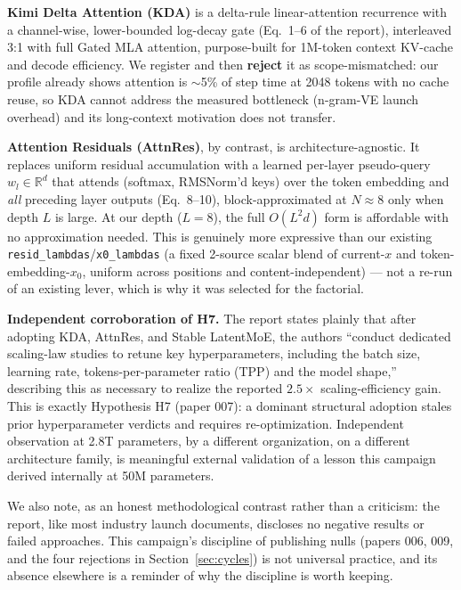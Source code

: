\documentclass{article}
\begin{document}
\textbf{Kimi Delta Attention (KDA)} is a delta-rule linear-attention recurrence with a channel-wise, lower-bounded log-decay gate (Eq.\ 1--6 of the report), interleaved 3:1 with full Gated MLA attention, purpose-built for 1M-token context KV-cache and decode efficiency. We register and then \textbf{reject} it as scope-mismatched: our profile already shows attention is $\sim$5\% of step time at 2048 tokens with no cache reuse, so KDA cannot address the measured bottleneck (n-gram-VE launch overhead) and its long-context motivation does not transfer.

\textbf{Attention Residuals (AttnRes)}, by contrast, is architecture-agnostic. It replaces uniform residual accumulation with a learned per-layer pseudo-query $w_l\in\mathbb{R}^d$ that attends (softmax, RMSNorm'd keys) over the token embedding and \emph{all} preceding layer outputs (Eq.\ 8--10), block-approximated at $N\!\approx\!8$ only when depth $L$ is large. At our depth ($L=8$), the full $O(L^2d)$ form is affordable with no approximation needed. This is genuinely more expressive than our existing \texttt{resid\_lambdas}/\texttt{x0\_lambdas} (a fixed 2-source scalar blend of current-$x$ and token-embedding-$x_0$, uniform across positions and content-independent) --- not a re-run of an existing lever, which is why it was selected for the factorial.

\textbf{Independent corroboration of H7.} The report states plainly that after adopting KDA, AttnRes, and Stable LatentMoE, the authors ``conduct dedicated scaling-law studies to retune key hyperparameters, including the batch size, learning rate, tokens-per-parameter ratio (TPP) and the model shape,'' describing this as necessary to realize the reported $2.5\times$ scaling-efficiency gain. This is exactly Hypothesis H7 (paper 007): a dominant structural adoption stales prior hyperparameter verdicts and requires re-optimization. Independent observation at 2.8T parameters, by a different organization, on a different architecture family, is meaningful external validation of a lesson this campaign derived internally at 50M parameters.

We also note, as an honest methodological contrast rather than a criticism: the report, like most industry launch documents, discloses no negative results or failed approaches. This campaign's discipline of publishing nulls (papers 006, 009, and the four rejections in Section~\ref{sec:cycles}) is not universal practice, and its absence elsewhere is a reminder of why the discipline is worth keeping.
\end{document}
